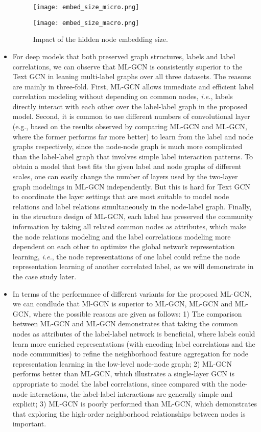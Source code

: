 \documentclass[conference]{IEEEtran}
\begin{document}
\begin{itemize}
\begin{figure}[t]
\centering
\begin{minipage}[b]{0.5\linewidth}
\centering 
\texttt{[image: embed\_size\_micro.png]}
\end{minipage}\begin{minipage}[b]{0.5\linewidth}
\centering 
\texttt{[image: embed\_size\_macro.png]}
\end{minipage}\caption{Impact of the hidden node embedding size.}
\end{figure}    
    \item For deep models that both preserved graph structures, labels and label correlations, we can observe that ML-GCN is consistently superior to the Text GCN in leaning multi-label graphs over all three datasets. The reasons are mainly in three-fold. First, ML-GCN allows immediate and efficient label correlation modeling without depending on common nodes, \textit{i.e.}, labels directly interact with each other over the label-label graph in the proposed model. Second, it is common to use different numbers of convolutional layer (e.g., based on the results observed by comparing ML-GCN and ML-GCN, where the former performs far more better) to learn from the label and node graphs respectively, since the node-node graph is much more complicated than the label-label graph that involves simple label interaction patterns. To obtain a model that best fits the given label and node graphs of different scales, one can easily change the number of layers used by the two-layer graph modelings in ML-GCN independently. But this is hard  for Text GCN to coordinate the layer settings that are most suitable to model node relations and label relations simultaneously in the node-label graph. Finally, in the structure design of ML-GCN, each label has preserved the community information by taking all related common nodes as attributes, which make the node relations modeling and the label correlations modeling more dependent on each other to optimize the global network representation learning, \textit{i.e.}, the node representations of one label could refine the node representation learning of another correlated label, as we will demonstrate in the case study later.
  \item In terms of the performance of different variants for the proposed ML-GCN, we can condlude that Ml-GCN is superior to ML-GCN, ML-GCN and ML-GCN, where the possible reasons are given as follows: 1) The comparison between ML-GCN and ML-GCN demonstrates that taking the common nodes as attributes of the label-label network is beneficial, where labels could learn more enriched representations (with encoding label correlations and the node communities) to refine the neighborhood feature aggregation for node representation learning in the low-level node-node graph; 2) ML-GCN performs better than ML-GCN, which illustrates a single-layer GCN is appropriate to model the label correlations, since compared with the node-node interactions, the label-label interactions are generally simple and explicit; 3) ML-GCN is poorly performed than ML-GCN, which demonstrates that exploring the high-order neighborhood relationships between nodes is important.
\end{itemize}
\end{document}
